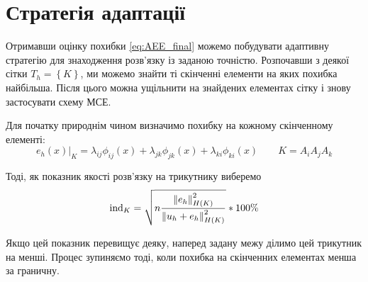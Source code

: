 
\section{Стратегія адаптації}

Отримавши оцінку похибки \eqref{eq:AEE_final} можемо побудувати адаптивну стратегію для знаходження розв'язку із заданою точністю.
Розпочавши з деякої сітки $T_h =  \left\{ K \right\}$, ми можемо знайти ті скінченні елементи на яких похибка найбільша.
Після цього можна ущільнити на знайдених елементах сітку і знову застосувати схему МСЕ.

Для початку природнім чином визначимо похибку на кожному скінченному елементі:
%
\newcommand{\error}[1]{\lambda_{#1} \phi_{#1}(x)}
\begin{equation}\label{eq:error_element}
	e_h(x)|_K = \error{ij}+\error{jk}+\error{ki} \qquad K = A_iA_jA_k
\end{equation}

Тоді, як показник якості розв'язку на трикутнику виберемо
%
\begin{equation}\label{eq:error_indicator}
	\text{ind}_K = \sqrt{n \frac
			{\left\lVert e_h\right\rVert^2_{H(K)}}
			{\left\lVert u_h+e_h\right\rVert^2_{H(K)}}
	}*100\%
\end{equation}

Якщо цей показник перевищує деяку, наперед задану межу ділимо цей трикутник на менші.
Процес зупиняємо тоді, коли похибка на скінченних елементах менша за граничну.

\undef{\error}
